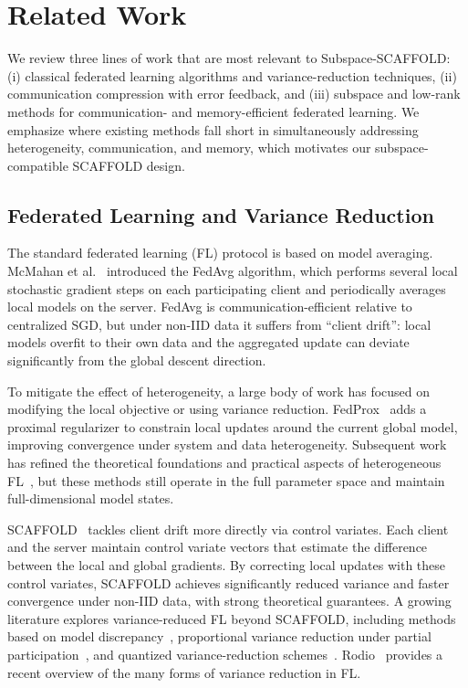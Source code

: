\section{Related Work}

We review three lines of work that are most relevant to Subspace-SCAFFOLD: (i) classical federated learning algorithms and variance-reduction techniques, (ii) communication compression with error feedback, and (iii) subspace and low-rank methods for communication- and memory-efficient federated learning. We emphasize where existing methods fall short in simultaneously addressing heterogeneity, communication, and memory, which motivates our subspace-compatible SCAFFOLD design.

\subsection{Federated Learning and Variance Reduction}

The standard federated learning (FL) protocol is based on model averaging. McMahan et al.~\cite{mcmahan2017communication,mcmahan2017fedavg} introduced the FedAvg algorithm, which performs several local stochastic gradient steps on each participating client and periodically averages local models on the server. FedAvg is communication-efficient relative to centralized SGD, but under non-IID data it suffers from ``client drift'': local models overfit to their own data and the aggregated update can deviate significantly from the global descent direction.

To mitigate the effect of heterogeneity, a large body of work has focused on modifying the local objective or using variance reduction. FedProx~\cite{li2018federated} adds a proximal regularizer to constrain local updates around the current global model, improving convergence under system and data heterogeneity. Subsequent work has refined the theoretical foundations and practical aspects of heterogeneous FL~\cite{li2020federated}, but these methods still operate in the full parameter space and maintain full-dimensional model states.

SCAFFOLD~\cite{karimireddy2020scaffold} tackles client drift more directly via control variates. Each client and the server maintain control variate vectors that estimate the difference between the local and global gradients. By correcting local updates with these control variates, SCAFFOLD achieves significantly reduced variance and faster convergence under non-IID data, with strong theoretical guarantees. A growing literature explores variance-reduced FL beyond SCAFFOLD, including methods based on model discrepancy~\cite{zhang2025modeldiscrepancy}, proportional variance reduction under partial participation~\cite{wang2025proportionalvr}, and quantized variance-reduction schemes~\cite{wang2025quantizedvr}. Rodio~\cite{rodio2025variance} provides a recent overview of the many forms of variance reduction in FL.


